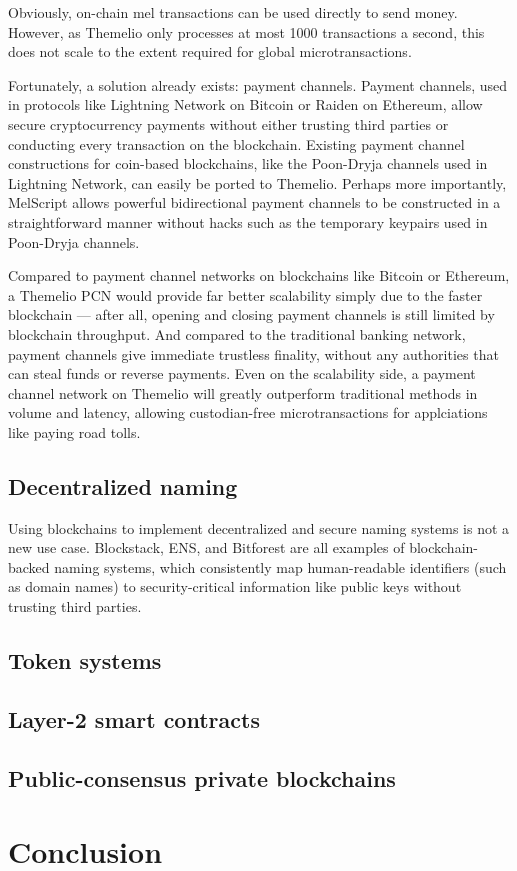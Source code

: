 \documentclass[headinclude]{scrbook}
\begin{document}
Obviously, on-chain mel transactions can be used directly to send money. However, as Themelio only processes at most 1000 transactions a second, this does not scale to the extent required for global microtransactions.

Fortunately, a solution already exists: payment channels. Payment channels, used in protocols like Lightning Network on Bitcoin or Raiden on Ethereum, allow secure cryptocurrency payments without either trusting third parties or conducting every transaction on the blockchain. Existing payment channel constructions for coin-based blockchains, like the Poon-Dryja channels used in Lightning Network, can easily be ported to Themelio. Perhaps more importantly, MelScript allows powerful bidirectional payment channels to be constructed in a straightforward manner without hacks such as the temporary keypairs used in Poon-Dryja channels.

Compared to payment channel networks on blockchains like Bitcoin or Ethereum, a Themelio PCN would provide far better scalability simply due to the faster blockchain --- after all, opening and closing payment channels is still limited by blockchain throughput. And compared to the traditional banking network, payment channels give immediate trustless finality, without any authorities that can steal funds or reverse payments. Even on the scalability side, a payment channel network on Themelio will greatly outperform traditional methods in volume and latency, allowing custodian-free microtransactions for applciations like paying road tolls.  

\section{Decentralized naming}

Using blockchains to implement decentralized and secure naming systems is not a new use case. Blockstack, ENS, and Bitforest are all examples of blockchain-backed naming systems, which consistently map human-readable identifiers (such as domain names) to security-critical information like public keys without trusting third parties. 


\section{Token systems}

\section{Layer-2 smart contracts}

\section{Public-consensus private blockchains}

\chapter{Conclusion}


\printbibliography
\end{document}
